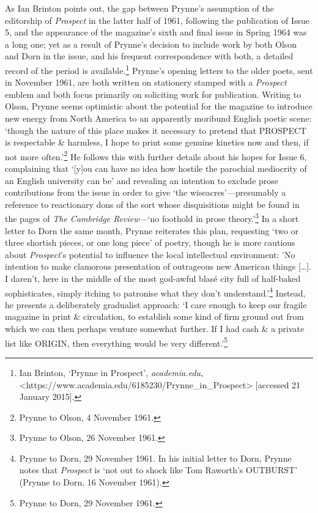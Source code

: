 \documentclass[]{article}
\begin{document}
As Ian Brinton points out, the gap between Prynne's assumption of the
editorship of \emph{Prospect} in the latter half of 1961, following the
publication of Issue 5, and the appearance of the magazine's sixth and
final issue in Spring 1964 was a long one; yet as a result of Prynne's
decision to include work by both Olson and Dorn in the issue, and his
frequent correspondence with both, a detailed record of the period is
available.\footnote{Ian Brinton, `Prynne in Prospect',
  \emph{academia.edu},
  \textless{}https://www.academia.edu/6185230/Prynne\_in\_Prospect\textgreater{}
  {[}accessed 21 January 2015{]}.} Prynne's opening letters to the older
poets, sent in November 1961, are both written on stationery stamped
with a \emph{Prospect} emblem and both focus primarily on soliciting
work for publication. Writing to Olson, Prynne seems optimistic about
the potential for the magazine to introduce new energy from North
America to an apparently moribund English poetic scene: `though the
nature of this place makes it necessary to pretend that PROSPECT is
respectable \& harmless, I hope to print some genuine kinetics now and
then, if not more often.'\footnote{Prynne to Olson, 4 November 1961.} He
follows this with further details about his hopes for Issue 6,
complaining that `{[}y{]}ou can have no idea how hostile the parochial
mediocrity of an English university can be' and revealing an intention
to exclude prose contributions from the issue in order to give `the
wiseacres'---presumably a reference to reactionary dons of the sort
whose disquisitions might be found in the pages of \emph{The Cambridge
Review}---`no foothold in prose theory.'\footnote{Prynne to Olson, 26
  November 1961.} In a short letter to Dorn the same month, Prynne
reiterates this plan, requesting `two or three shortish pieces, or one
long piece' of poetry, though he is more cautious about
\emph{Prospect}'s potential to influence the local intellectual
environment: 'No intention to make clamorous presentation of outrageous
new American things {[}\ldots{}{]}. I daren't, here in the middle of the
most god-awful blasé city full of half-baked sophisticates, simply
itching to patronise what they don't understand.'\footnote{Prynne to
  Dorn, 29 November 1961. In his initial letter to Dorn, Prynne notes
  that \emph{Prospect} is `not out to shock like Tom Raworth's OUTBURST'
  (Prynne to Dorn, 16 November 1961).} Instead, he presents a
deliberately gradualist approach: `I care enough to keep our fragile
magazine in print \& circulation, to establish some kind of firm ground
out from which we can then perhaps venture somewhat further. If I had
cash \& a private list like ORIGIN, then everything would be very
different.'\footnote{Prynne to Dorn, 29 November 1961.}
\end{document}
